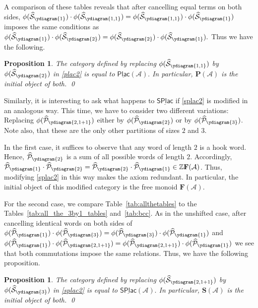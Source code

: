 \documentclass[12 pt]{amsart}
\newcommand{\Z}{\mathbb{Z}}
\newcommand{\Plactic}{{\mathbf{P}}}
\newcommand{\Free}{\mathbf{F}}
\newcommand{\sPlactic}{\mathbf{S}}
\newcommand{\Category}{\underline{\mathsf{SPlac}}}
\newcommand{\LSCategory}{\underline{\mathsf{Plac}}}
\newcommand{\FreeSchur}{\widehat{\mathcal{S}}}
\newcommand{\sFreeSchur}{\widehat{\mathcal{P}}}
\newcommand{\cA}{\mathcal{A}}
\newtheorem{proposition}[thm]{Proposition}
\theoremstyle{remark}
\numberwithin{equation}{section}
\begin{document}
A comparison of these tables reveals that after cancelling equal terms on both sides, $\phi(\FreeSchur_{\ydiagram{1}})\cdot \phi(\FreeSchur_{\ydiagram{1,1}}) = \phi(\FreeSchur_{\ydiagram{1,1}}) \cdot \phi(\FreeSchur_{\ydiagram{1}})$ imposes the same conditions as $\phi(\FreeSchur_{\ydiagram{1}})\cdot \phi(\FreeSchur_{\ydiagram{2}})=\phi(\FreeSchur_{\ydiagram{2}}) \cdot \phi(\FreeSchur_{\ydiagram{1}}).$ Thus we have the following.

\begin{proposition}
    The category defined by replacing $\phi(\FreeSchur_{\ydiagram{1,1}})$ by $\phi(\FreeSchur_{\ydiagram{2}})$ in \ref{plac2} is equal to $\LSCategory(\cA).$ In particular, $\Plactic(\cA)$ is the initial object of both. \qed
\end{proposition}

Similarly, it is interesting to ask what happens to $\Category$ if \ref{splac2} is modified in an analogous way. This time, we have to consider two different variations: Replacing $\phi(\sFreeSchur_{\ydiagram{2,1+1}})$ either by 
$\phi(\sFreeSchur_{\ydiagram{2}})$ or by $\phi(\sFreeSchur_{\ydiagram{3}})$. Note also, that these are the only other partitions of sizes $2$ and $3$.

In the first case, it suffices to observe that any word of length $2$ is a hook word. Hence, $\sFreeSchur_{\ydiagram{2}}$ is a sum of all possible words of length $2$. Accordingly, $\sFreeSchur_{\ydiagram{1}}\cdot \sFreeSchur_{\ydiagram{2}} = \sFreeSchur_{\ydiagram{2}} \cdot \sFreeSchur_{\ydiagram{1}} \in \Z\Free(\cA)$. Thus, modifying \ref{splac2} in this way makes the axiom redundant. In particular, the initial object of this modified category is the free monoid $\Free(\cA).$

For the second case, we compare Table~\ref{tab:allthetables} to the Tables~\ref{tab:all_the_3by1_tables} and~\ref{tab:bcc}. As in the unshifted case, after cancelling identical words on both sides of $\phi(\sFreeSchur_{\ydiagram{1}})\cdot\phi(\sFreeSchur_{\ydiagram{3}}) = \phi(\sFreeSchur_{\ydiagram{3}}) \cdot \phi(\sFreeSchur_{\ydiagram{1}})$ and $\phi(\sFreeSchur_{\ydiagram{1}}) \cdot\phi(\sFreeSchur_{\ydiagram{2,1+1}}) = \phi(\sFreeSchur_{\ydiagram{2,1+1}}) \cdot \phi(\sFreeSchur_{\ydiagram{1}})$ we see that both commutations impose the same relations. Thus, we have the following proposition.

\begin{proposition}
    The category defined by replacing $\phi(\FreeSchur_{\ydiagram{2,1+1}})$ by $\phi(\FreeSchur_{\ydiagram{3}})$ in \ref{splac2} is equal to $\Category(\cA).$ In particular, $\sPlactic(\cA)$ is the initial object of both. \qed
\end{proposition}
\end{document}
